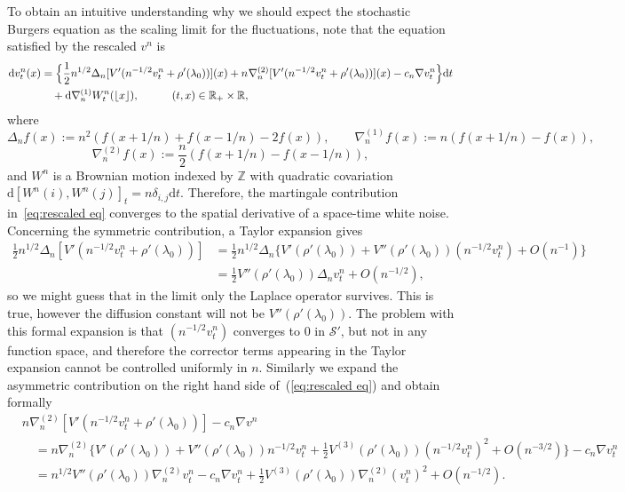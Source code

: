 \documentclass[11pt, a4paper]{article}
\newcommand{\mathd}{\mathrm{d}}
\newcommand{\CS}{\mathscr{S}}
\newcommand{\R}{\mathbb{R}}
\newcommand{\1}{\mathbf{1}}
\begin{document}
To obtain an intuitive understanding why we should expect the stochastic Burgers equation as the scaling limit for the fluctuations, note that the equation satisfied by the rescaled $v^n$ is
\begin{align}
  \label{eq:rescaled eq} \notag
  \mathd v^n_t (x) &= \Big\{ \frac{1}{2} n^{1 / 2}
  \Delta_n [V' (n^{- 1 / 2} v^n_t + \rho' (\lambda_0))] (x) + n^{}
  \nabla^{(2)}_n [V' (n^{- 1 / 2} v^n_t + \rho' (\lambda_0))] (x) - c_n \nabla
  v^n_t \Big\} \mathd t \\
  &\quad
  + \mathd \nabla^{(1)}_n W^n_t (\lfloor x \rfloor), \quad \qquad (t,x) \in \R_+ \times \R, 
\end{align}
where
\[ \Delta_n f (x) := n^2 (f (x + 1 / n) + f (x - 1 / n) - 2 f (x)),
   \hspace{2em} \nabla^{(1)}_n f (x) := n (f (x + 1 / n) - f (x)), \]
\[ \nabla^{(2)}_n f (x) := \frac{n}{2} (f (x + 1 / n) - f (x - 1 / n)), \]
and $W^n$ is a Brownian motion indexed by $\mathbb{Z}$ with quadratic covariation $\mathd [W^n (i), W^n (j)]_t = n \delta_{i, j} \mathd t$. Therefore, the martingale contribution in~\eqref{eq:rescaled eq} converges to the spatial derivative of a space-time white noise. Concerning the symmetric contribution, a Taylor expansion gives
\begin{align}\label{eq:formal_linear} \nonumber
  \frac{1}{2} n^{1 / 2} \Delta_n [V' (n^{- 1 / 2} v^n_t + \rho' (\lambda_0))]
  & = \frac{1}{2} n^{1 / 2} \Delta_n \{V' (\rho' (\lambda_0)) + V'' (\rho'
     (\lambda_0)) (n^{- 1 / 2} v^n_t) + O (n^{- 1})\} \\
  & = \frac{1}{2} V'' (\rho' (\lambda_0)) \Delta_n v^n_t + O (n^{- 1 / 2}),
\end{align}
so we might guess that in the limit only the Laplace operator survives. This is true, however the diffusion constant will not
be $V'' (\rho' (\lambda_0))$. The problem with this formal
expansion is that $(n^{- 1 / 2} v^n_t)$ converges to $0$ in $\CS'$, but not in
any function space, and therefore the corrector terms appearing in the Taylor expansion cannot be controlled uniformly in $n$. Similarly we expand the asymmetric contribution on the right hand
side of~(\ref{eq:rescaled eq}) and obtain formally
\begin{align}\label{eq:formal_nonlinear} \nonumber
 &n \nabla^{(2)}_n [V' (n^{- 1 / 2} v^n_t + \rho' (\lambda_0))] - c_n
 \nabla v^n \\ \nonumber
 &\quad= n \nabla^{(2)}_n \Big\{ V' (\rho' (\lambda_0)) + V'' (\rho' (\lambda_0))
 n^{- 1 / 2} v^n_t + \frac{1}{2} V^{(3)} (\rho' (\lambda_0)) (n^{- 1 / 2}
 v^n_t)^2 + O (n^{- 3 / 2}) \Big\} - c_n \nabla v^n_t \\
 &\quad= n^{1 / 2} V'' (\rho' (\lambda_0)) \nabla^{(2)}_n v^n_t - c_n \nabla v^n_t
 + \frac{1}{2} V^{(3)} (\rho' (\lambda_0)) \nabla^{(2)}_n (v^n_t)^2 + O (n^{- 1 / 2}).
\end{align}
\end{document}

